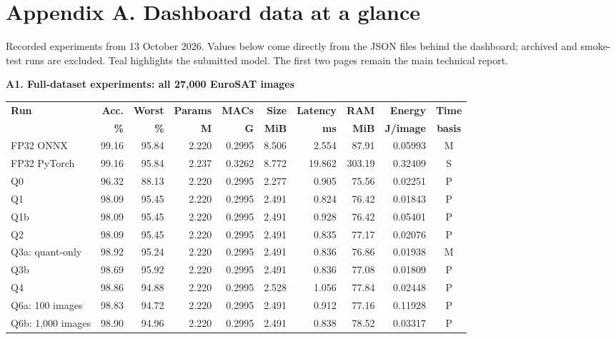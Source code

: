 \clearpage
\section*{Appendix A. Dashboard data at a glance}
\noindent\small Recorded experiments from 13 October 2026. Values below come directly from the JSON files behind the dashboard; archived and smoke-test runs are excluded. Teal highlights the submitted model. The first two pages remain the main technical report.
\vspace{5pt}

\noindent\textbf{A1. Full-dataset experiments: all 27,000 EuroSAT images}
\begin{center}
\fontsize{8.5}{10}\selectfont
\setlength{\tabcolsep}{4.3pt}\renewcommand{\arraystretch}{1.2}
\begin{tabular*}{\textwidth}{@{\extracolsep{\fill}}lrrrrrrrrc@{}}
\toprule
\rowcolor{slate}\textbf{Run} & \textbf{Acc.} & \textbf{Worst} & \textbf{Params} & \textbf{MACs} & \textbf{Size} & \textbf{Latency} & \textbf{RAM} & \textbf{Energy} & \textbf{Time}\\
\rowcolor{slate} & \textbf{\%} & \textbf{\%} & \textbf{M} & \textbf{G} & \textbf{MiB} & \textbf{ms} & \textbf{MiB} & \textbf{J/image} & \textbf{basis}\\
\midrule
FP32 ONNX & 99.16 & 95.84 & 2.220 & 0.2995 & 8.506 & 2.554 & 87.91 & 0.05993 & M\\
FP32 PyTorch & 99.16 & 95.84 & 2.237 & 0.3262 & 8.772 & 19.862 & 303.19 & 0.32409 & S\\
Q0 & 96.32 & 88.13 & 2.220 & 0.2995 & 2.277 & 0.905 & 75.56 & 0.02251 & P\\
Q1 & 98.09 & 95.45 & 2.220 & 0.2995 & 2.491 & 0.824 & 76.42 & 0.01843 & P\\
Q1b & 98.09 & 95.45 & 2.220 & 0.2995 & 2.491 & 0.928 & 76.42 & 0.05401 & P\\
Q2 & 98.09 & 95.45 & 2.220 & 0.2995 & 2.491 & 0.835 & 77.17 & 0.02076 & P\\
Q3a: quant-only & 98.92 & 95.24 & 2.220 & 0.2995 & 2.491 & 0.836 & 76.86 & 0.01938 & M\\
Q3b & 98.69 & 95.92 & 2.220 & 0.2995 & 2.491 & 0.836 & 77.08 & 0.01809 & P\\
Q4 & 98.86 & 94.88 & 2.220 & 0.2995 & 2.528 & 1.056 & 77.84 & 0.02448 & P\\
Q6a: 100 images & 98.83 & 94.72 & 2.220 & 0.2995 & 2.491 & 0.912 & 77.16 & 0.11928 & P\\
Q6b: 1,000 images & 98.90 & 94.96 & 2.220 & 0.2995 & 2.491 & 0.838 & 78.52 & 0.03317 & P\\

\end{tabular*}
\end{center}

